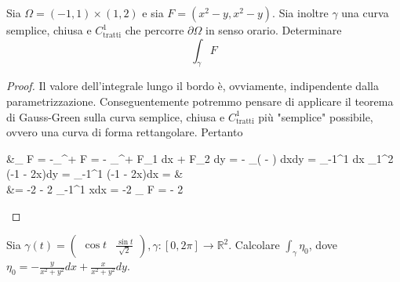 \begin{example}
	Sia $\Omega = (-1, 1) \times (1, 2)$ e sia $F=(x^2 - y, x^2 - y)$. Sia inoltre $\gamma$ una curva semplice, chiusa e $C^1_\text{tratti}$ che percorre $\partial \Omega$ in senso orario. Determinare
	$$
	\int_\gamma F
	$$
\end{example}
\begin{proof}
	Il valore dell'integrale lungo il bordo è, ovviamente, indipendente dalla parametrizzazione. Conseguentemente potremmo pensare di applicare il teorema di Gauss-Green sulla curva semplice, chiusa e $C^1_\text{tratti}$ più "semplice" possibile, ovvero una curva di forma rettangolare.
	Pertanto
	\begin{flalign*}
	&\int_{\gamma} F = -\int_{\partial^{+} \Omega} F = - \int_{\partial^{+} \Omega} F_1 dx + F_2 dy = - \int_\Omega \left(  -  \right) dxdy = \int_{-1}^{1} dx \int_1^2 (-1 - 2x)dy = \int_{-1}^{1} (-1 - 2x)dx = & \\ 
	&= -2 - 2 \int_{-1}^1 xdx = -2 \implies \int_{\gamma} F = - 2
	\end{flalign*}
\end{proof}
\begin{example}
	Sia $\gamma(t) = \begin{pmatrix} \cos{t} & \frac{\sin{t}}{\sqrt{2}} \end{pmatrix}, \gamma: [0, 2\pi] \to \mathbb{R}^2$. Calcolare $\int_\gamma \eta_0$, dove $\eta_0 = - \frac{y}{x^2 + y^2}dx + \frac{x}{x^2 + y^2}dy$.
\end{example}
